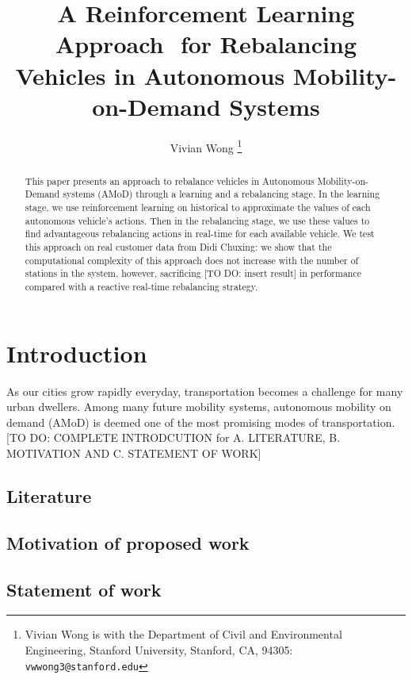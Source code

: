\documentclass[letterpaper, 10 pt, conference]{ieeeconf}  %
\title{\LARGE \bf
A Reinforcement Learning Approach  for Rebalancing Vehicles in Autonomous Mobility-on-Demand Systems
}
\author{Vivian Wong%
\thanks{Vivian Wong is with the Department of Civil and Environmental Engineering, Stanford University, Stanford, CA, 94305:
        {\tt\small vwwong3@stanford.edu}}%
}
\begin{document}
\maketitle
\thispagestyle{empty}
\pagestyle{empty}


\begin{abstract}

This paper presents an approach to rebalance vehicles in Autonomous Mobility-on-Demand systems (AMoD) through a learning and a rebalancing stage. In the learning stage, we use reinforcement learning on historical to approximate the values of each autonomous vehicle's actions. Then in the rebalancing stage, we use these values to find advantageous rebalancing actions in real-time for each available vehicle. We test this approach on real customer data from Didi Chuxing: we show that the computational complexity of this approach does not increase with the number of stations in the system, however, sacrificing [TO DO: insert result] in performance compared with a reactive real-time rebalancing strategy.  

\end{abstract}


\section{Introduction}

As our cities grow rapidly everyday, transportation becomes a challenge for many urban dwellers. Among many future mobility systems, autonomous mobility on demand (AMoD) is deemed one of the most promising modes of transportation. [TO DO: COMPLETE INTRODCUTION for A. LITERATURE, B. MOTIVATION AND C. STATEMENT OF WORK]

\subsection{Literature}

\subsection{Motivation of proposed work} 

\subsection{Statement of work} 
\end{document}
